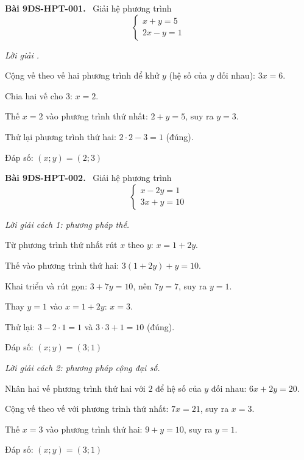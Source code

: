 \documentclass[12pt,a4paper]{article}
\newenvironment{problem}[1][]{\par\medskip\noindent\textbf{Bài #1.}\ }{\par}
\newenvironment{solution}[1][]{\par\noindent\textit{Lời giải #1.}\par}{\par}
\begin{document}
\begin{problem}[9DS-HPT-001]
Giải hệ phương trình
\[ \begin{cases} x + y = 5 \\ 2x - y = 1 \end{cases} \]

\begin{solution}
Cộng vế theo vế hai phương trình để khử $y$ (hệ số của $y$ đối nhau): $3x = 6$.

Chia hai vế cho $3$: $x = 2$.

Thế $x = 2$ vào phương trình thứ nhất: $2 + y = 5$, suy ra $y = 3$.

Thử lại phương trình thứ hai: $2 \cdot 2 - 3 = 1$ (đúng).

Đáp số: $\boxed{(x; y) = (2; 3)}$
\end{solution}
\end{problem}

\begin{problem}[9DS-HPT-002]
Giải hệ phương trình
\[ \begin{cases} x - 2y = 1 \\ 3x + y = 10 \end{cases} \]

\begin{solution}[cách 1: phương pháp thế]
Từ phương trình thứ nhất rút $x$ theo $y$: $x = 1 + 2y$.

Thế vào phương trình thứ hai: $3(1 + 2y) + y = 10$.

Khai triển và rút gọn: $3 + 7y = 10$, nên $7y = 7$, suy ra $y = 1$.

Thay $y = 1$ vào $x = 1 + 2y$: $x = 3$.

Thử lại: $3 - 2 \cdot 1 = 1$ và $3 \cdot 3 + 1 = 10$ (đúng).

Đáp số: $\boxed{(x; y) = (3; 1)}$
\end{solution}

\begin{solution}[cách 2: phương pháp cộng đại số]
Nhân hai vế phương trình thứ hai với $2$ để hệ số của $y$ đối nhau: $6x + 2y = 20$.

Cộng vế theo vế với phương trình thứ nhất: $7x = 21$, suy ra $x = 3$.

Thế $x = 3$ vào phương trình thứ hai: $9 + y = 10$, suy ra $y = 1$.

Đáp số: $\boxed{(x; y) = (3; 1)}$
\end{solution}
\end{problem}
\end{document}

